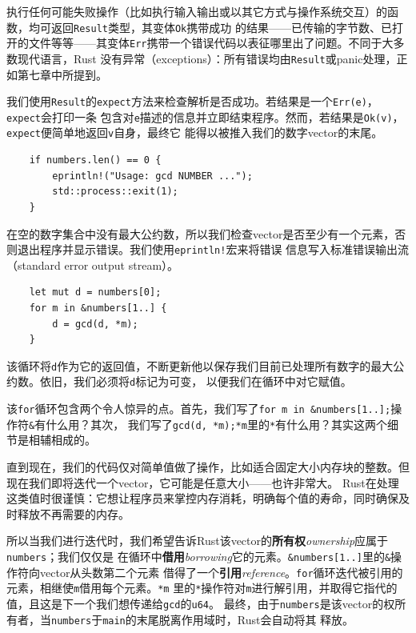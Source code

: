 执行任何可能失败操作（比如执行输入输出或以其它方式与操作系统交互）的函数，均可返回\texttt{Result}类型，其变体\texttt{Ok}携带成功
的结果------已传输的字节数、已打开的文件等等------其变体\texttt{Err}携带一个错误代码以表征哪里出了问题。不同于大多数现代语言，Rust
没有异常（exceptions）：所有错误均由\texttt{Result}或panic处理，正如第七章中所提到。

\medskip
我们使用\texttt{Result}的\texttt{expect}方法来检查解析是否成功。若结果是一个\texttt{Err(e)}，\texttt{expect}会打印一条
包含对\texttt{e}描述的信息并立即结束程序。然而，若结果是\texttt{Ok(v)}，\texttt{expect}便简单地返回\texttt{v}自身，最终它
能得以被推入我们的数字vector的末尾。
\begin{verbatim}
    if numbers.len() == 0 {
        eprintln!("Usage: gcd NUMBER ...");
        std::process::exit(1);
    }
\end{verbatim}

\smallskip
在空的数字集合中没有最大公约数，所以我们检查vector是否至少有一个元素，否则退出程序并显示错误。我们使用\texttt{eprintln!}宏来将错误
信息写入标准错误输出流（standard error output stream）。
\begin{verbatim}
    let mut d = numbers[0];
    for m in &numbers[1..] {
        d = gcd(d, *m);
    }
\end{verbatim}

\smallskip
该循环将\texttt{d}作为它的返回值，不断更新他以保存我们目前已处理所有数字的最大公约数。依旧，我们必须将\texttt{d}标记为可变，
以便我们在循环中对它赋值。

\medskip
该\texttt{for}循环包含两个令人惊异的点。首先，我们写了\texttt{for m in \&numbers[1..];}操作符\texttt{\&}有什么用？其次，
我们写了\texttt{gcd(d, *m);}\texttt{*m}里的\texttt{*}有什么用？其实这两个细节是相辅相成的。

\medskip
直到现在，我们的代码仅对简单值做了操作，比如适合固定大小内存块的整数。但现在我们即将迭代一个vector，它可能是任意大小------也许非常大。
Rust在处理这类值时很谨慎：它想让程序员来掌控内存消耗，明确每个值的寿命，同时确保及时释放不再需要的内存。

\medskip
所以当我们进行迭代时，我们希望告诉Rust该vector的\textbf{所有权}\textit{ownership}应属于\texttt{numbers}；我们仅仅是
在循环中\textbf{借用}\textit{borrowing}它的元素。\texttt{\&numbers[1..]}里的\texttt{\&}操作符向vector从头数第二个元素
借得了一个\textbf{引用}\textit{reference}。\texttt{for}循环迭代被引用的元素，相继使\texttt{m}借用每个元素。\texttt{*m}
里的\texttt{*}操作符对\texttt{m}进行解引用，并取得它指代的值，且这是下一个我们想传递给\texttt{gcd}的\texttt{u64}。
最终，由于\texttt{numbers}是该vector的权所有者，当\texttt{numbers}于\texttt{main}的末尾脱离作用域时，Rust会自动将其
释放。

